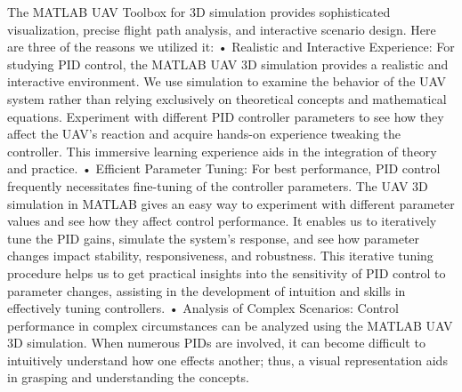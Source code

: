 The MATLAB UAV Toolbox for 3D simulation provides sophisticated visualization, precise flight path analysis, and interactive scenario design. Here are three of the reasons we utilized it:
•	Realistic and Interactive Experience: For studying PID control, the MATLAB UAV 3D simulation provides a realistic and interactive environment. We use simulation to examine the behavior of the UAV system rather than relying exclusively on theoretical concepts and mathematical equations. Experiment with different PID controller parameters to see how they affect the UAV's reaction and acquire hands-on experience tweaking the controller. This immersive learning experience aids in the integration of theory and practice.
•	Efficient Parameter Tuning: For best performance, PID control frequently necessitates fine-tuning of the controller parameters. The UAV 3D simulation in MATLAB gives an easy way to experiment with different parameter values and see how they affect control performance. It enables us to iteratively tune the PID gains, simulate the system's response, and see how parameter changes impact stability, responsiveness, and robustness. This iterative tuning procedure helps us to get practical insights into the sensitivity of PID control to parameter changes, assisting in the development of intuition and skills in effectively tuning controllers.
•	Analysis of Complex Scenarios: Control performance in complex circumstances can be analyzed using the MATLAB UAV 3D simulation. When numerous PIDs are involved, it can become difficult to intuitively understand how one effects another; thus, a visual representation aids in grasping and understanding the concepts.
